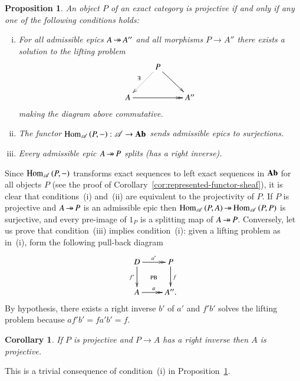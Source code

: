 \documentclass[1p]{elsarticle}
\makeatletter
\renewenvironment{proof}[1][\proofname]{\par
  \pushQED{\qed}%
  \normalfont \topsep6\p@\@plus6\p@\relax
  \trivlist
  \item[\hskip\labelsep
        \scshape
    #1\@addpunct{.}]\ignorespaces
}{%
  \popQED\endtrivlist\@endpefalse
}
\theoremstyle{mythm}
\newtheorem{Cor}[Thm]{Corollary}
\newtheorem{Prop}[Thm]{Proposition}
\theoremstyle{mydef}
\makeatother
\begin{document}
\begin{Prop}
  \label{prop:projectivity}
  An object $P$ of an exact category is projective if and only if any
  one of the following conditions holds:
  \begin{enumerate}[(i)]
    \item
      For all admissible epics $A \operatorname{\twoheadrightarrow} A''$ and all morphisms
      $P \to A''$ there exists a solution to the lifting problem
      \[
      \xymatrix{
        & P \ar@{.>}[dl]_{\exists} \ar[dr] \\
        A \ar@{->>}[rr] & & A''
      }
      \]
      making the diagram above commutative.
      
    \item
      The functor $\operatorname{Hom}_{\operatorname{\mathscr{A}}}{(P,{-})}: \operatorname{\mathscr{A}} \to \operatorname{\mathbf{Ab}}$ sends
      admissible epics to surjections.
      
    \item
      Every admissible epic $A \operatorname{\twoheadrightarrow} P$ splits (has a right inverse).
  \end{enumerate}
\end{Prop}

\begin{proof}
  Since $\operatorname{Hom}_{\operatorname{\mathscr{A}}}{(P,{-})}$ transforms exact sequences to left
  exact sequences in $\operatorname{\mathbf{Ab}}$ for all objects $P$ 
  (see the proof of Corollary~\ref{cor:represented-functor-sheaf}), 
  it is clear that
  conditions~(i) and~(ii) are equivalent to the projectivity of $P$. If
  $P$ is projective and $A \operatorname{\twoheadrightarrow} P$ is an admissible epic then 
  $\operatorname{Hom}_{\operatorname{\mathscr{A}}}{(P,A)} \operatorname{\twoheadrightarrow} \operatorname{Hom}_{\operatorname{\mathscr{A}}}{(P,P)}$ is surjective, and
  every pre-image of $1_{P}$ is a splitting map of
  $A \operatorname{\twoheadrightarrow} P$. Conversely, let us prove that condition~(iii) implies
  condition~(i): given a lifting problem as in~(i), form the following
  pull-back diagram
  \[
  \xymatrix{
    D \ar[d]_{f'} \ar@{->>}[r]^{a'} \ar@{}[dr]|{\text{PB}}
    & P \ar[d]^{f} \\
    A \ar@{->>}[r]^{a} & A''.
  }
  \]
  By hypothesis, there exists a right inverse $b'$ of $a'$
  and $f'b'$ solves the lifting problem because 
  $a f' b' = f a' b' = f$.
\end{proof}

\begin{Cor}
  If $P$ is projective and $P \to A$ has a right inverse then $A$ is
  projective. 
\end{Cor}
\begin{proof}
  This is a trivial consequence of condition~(i) in
  Proposition~\ref{prop:projectivity}.
\end{proof}
\end{document}
